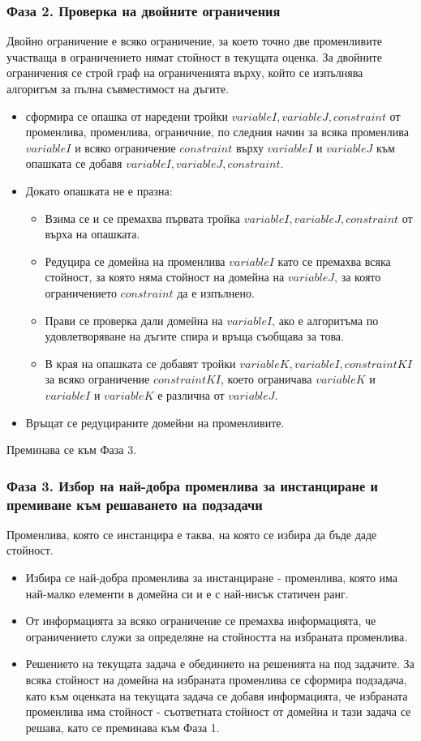 \documentclass[a4paper, 12pt]{article}
\begin{document}
\subsubsection{Фаза 2. Проверка на двойните ограничения}
Двойно ограничение е всяко ограничение, за което точно две променливите участваща в ограничението нямат стойност в текущата оценка.
За двойните ограничения се строй граф на ограниченията върху, който се изпълнява алгоритъм за пълна съвместимост на дъгите.
\begin{itemize}
\item сформира се опашка от наредени тройки \(variableI, variableJ, constraint\) от променлива, променлива, ограничние,
по следния начин за всяка променлива \(variableI\) и всяко ограничение \(constraint\) върху \(variableI\) и \(variableJ\)
към опашката се добавя \(variableI, variableJ, constraint\).
\item Докато опашката не е празна:
\begin{itemize}
\item Взима се и се премахва първата тройка \(variableI, variableJ, constraint\) от върха на опашката.
\item Редуцира се домейна на променлива \(variableI\) като се премахва всяка стойност, за която няма стойност на домейна на \(variableJ\),
за която ограничението \(constraint\) да е изпълнено.
\item Прави се проверка дали домейна на \(variableI\), ако е алгоритъма по удовлетворяване на дъгите спира и връща съобщава за това.
\item В края на опашката се добавят тройки \(variableK, variableI, constraintKI\) за всяко ограничение \(constraintKI\),
което ограничава \(variableK\) и \(variableI\) и \(variableK\) е различна от \(variableJ\).
\end{itemize}
\item Връщат се редуцираните домейни на променливите.
\end{itemize}
Преминава се към Фаза 3.
\subsubsection{Фаза 3. Избор на най-добра променлива за инстанциране и премиване към решаването на подзадачи}
Променлива, която се инстанцира е таква, на която се избира да бъде даде стойност.
\begin{itemize}
\item Избира се най-добра променлива за инстанциране - променлива,
която има най-малко елементи в домейна си и е с най-нисък статичен ранг.
\item От информацията за всяко ограничение се премахва информацията,
че ограничението служи за определяне на стойността на избраната променлива.
\item Решението на текущата задача е обединието на решенията на под задачите.
За всяка стойност на домейна на избраната променлива се сформира подзадача,
като към оценката на текущата задача се добавя информацията, че избраната променлива има стойност - съответната стойност от домейна и тази задача се решава,
като се преминава към Фаза 1.  
\end{itemize}
\end{document}
